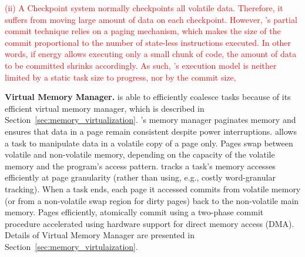 \textcolor{red}{(ii) A Checkpoint system normally checkpoints all volatile data. Therefore, it suffers from moving large amount of data on each checkpoint. However, \sys's partial commit technique relies on a paging mechanism, which makes the size of the commit proportional to the number of state-less instructions executed. In other words, if energy allows executing only a small chunk of code, the amount of data to be committed shrinks accordingly. As such, \sys's execution model is neither limited by a static task size to progress, nor by the commit size,
}

\textbf{\sys Virtual Memory Manager.} \sys is able to efficiently coalesce tasks because of its efficient virtual memory manager, which is described in Section~\ref{sec:memory_virtualization}. \sys's memory manager paginates memory and ensures that data in a page remain consistent despite power interruptions. \sys allows a task to manipulate data in a volatile copy of a page only. Pages swap between volatile and non-volatile memory, depending on the capacity of the volatile memory and the program's access pattern. \sys tracks a task's memory accesses efficiently at page granularity (rather than using, e.g., costly word-granular tracking). When a task ends, each page it accessed commits from volatile memory (or from a non-volatile swap region for dirty pages) back to the non-volatile main memory. Pages efficiently, atomically commit using a two-phase commit procedure accelerated using hardware support for direct memory access (DMA). Details of Virtual Memory Manager are presented in Section~\ref{sec:memory_virtulaization}.